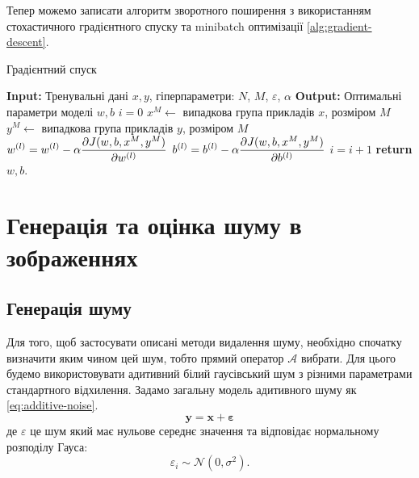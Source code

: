 \documentclass[14pt,a4paper]{extarticle}
\renewcommand{\algorithmicrequire}{\textbf{Input: }}
\renewcommand{\algorithmicensure}{\textbf{Output: }}
\newcommand{\algorithmreturn}{\textbf{return }}
\newcounter{e}
\numberwithin{equation}{section}
\numberwithin{figure}{section}
\begin{document}
	Тепер можемо записати алгоритм зворотного поширення з використанням стохастичного градієнтного спуску та minibatch оптимізації \ref{alg:gradient-descent}.
	\begin{algorithm}[H]
	\caption{Градієнтний спуск}
	\label{alg:gradient-descent}
	\begin{algorithmic}[1]
		\State \algorithmicrequire{Тренувальні дані $x, y$, гіперпараметри: $N$, $M$, $\varepsilon$, $\alpha$}
		\State \algorithmicensure{ Оптимальні параметри моделі $w, b$}
		\State $i = 0$
		\State $x^M \leftarrow$ випадкова група прикладів $x$, розміром $M$
		\State $y^M \leftarrow$ випадкова група прикладів $y$, розміром $M$
		\State $\displaystyle w^{(l)} = w^{(l)} -  \alpha \pdv{J(w, b, x^M, y^M)}{w^{(l)}}$
		\vspace{0.2cm}
		\State $\displaystyle b^{(l)} = b^{(l)} - \alpha \pdv{J(w, b, x^M, y^M)}{b^{(l)}}$
		\State $\displaystyle i = i + 1$
		\EndFor
		\EndWhile
		\State \algorithmreturn{$w, b$}.
	\end{algorithmic}
	\end{algorithm}

	\newpage
	\thispagestyle{empty}
	\section{Генерація та оцінка шуму в зображеннях}
	
	\subsection{Генерація шуму}	
	Для того, щоб застосувати описані методи видалення шуму, необхідно спочатку визначити яким чином цей шум, тобто прямий оператор $\mathcal{A}$ вибрати. Для цього будемо використовувати адитивний білий гаусівський шум з різними параметрами стандартного відхилення. Задамо загальну модель адитивного шуму як \ref{eq:additive-noise}.
	\begin{equation}
		\label{eq:additive-noise}
		\mathbf{y}=\mathbf{x} + \mathbf{\varepsilon}
	\end{equation}
	де $\varepsilon$ це шум який має нульове середнє значення та відповідає нормальному розподілу Гауса:
	\begin{equation}
		\varepsilon_{i} \sim \mathcal{N}\left(0, \sigma^{2}\right) .
	\end{equation}
	
\end{document}
